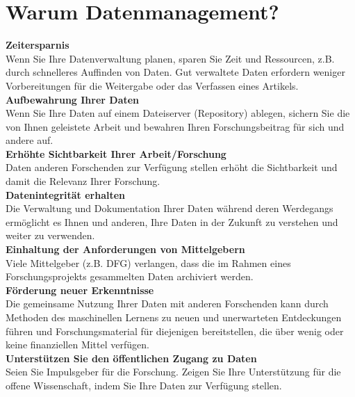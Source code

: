 \section{Warum Datenmanagement?}

\textbf{Zeitersparnis} \\
Wenn Sie Ihre Datenverwaltung planen, sparen Sie Zeit und Ressourcen, z.B.
durch schnelleres Auffinden von Daten. Gut verwaltete Daten erfordern weniger
Vorbereitungen für die Weitergabe oder das Verfassen eines Artikels. \\[6pt]
%
\textbf{Aufbewahrung Ihrer Daten} \\
Wenn Sie Ihre Daten auf einem Dateiserver (Repository) ablegen, sichern Sie
die von Ihnen geleistete Arbeit und bewahren Ihren Forschungsbeitrag für
sich und andere auf. \\[6pt]
%
\textbf{Erhöhte Sichtbarkeit Ihrer Arbeit/Forschung} \\
Daten anderen Forschenden zur Verfügung stellen erhöht die Sichtbarkeit und damit die Relevanz Ihrer Forschung. \\[6pt]
%
\textbf{Datenintegrität erhalten} \\
Die Verwaltung und Dokumentation Ihrer Daten während deren Werdegangs
ermöglicht es Ihnen und anderen, Ihre Daten in der Zukunft zu verstehen und
weiter zu verwenden.\\[6pt]
%
\textbf{Einhaltung der Anforderungen von Mittelgebern} \\
Viele Mittelgeber (z.B. DFG) verlangen, dass die im Rahmen eines
Forschungsprojekts gesammelten Daten archiviert werden.\\[6pt]
%
\textbf{Förderung neuer Erkenntnisse} \\
Die gemeinsame Nutzung Ihrer Daten mit anderen Forschenden kann durch
Methoden des maschinellen Lernens zu neuen und unerwarteten Entdeckungen führen
und Forschungsmaterial für diejenigen bereitstellen, die über wenig oder keine
finanziellen Mittel verfügen. \\[6pt]
%
\textbf{Unterstützen Sie den öffentlichen Zugang zu Daten} \\
Seien Sie Impulsgeber für die Forschung. Zeigen Sie Ihre Unterstützung für die
offene Wissenschaft, indem Sie Ihre Daten zur Verfügung stellen.
